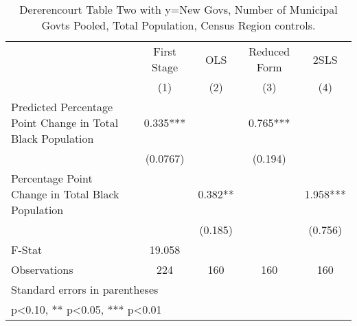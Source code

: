 \begin{table}[htbp]\centering
\def\sym#1{\ifmmode^{#1}\else\(^{#1}\)\fi}
\caption{Dererencourt Table Two with y=New Govs, Number of Municipal Govts  Pooled, Total Population, Census Region controls.}
\begin{tabular}{l*{4}{c}}
\toprule
                    & First Stage   &         OLS   &Reduced Form   &        2SLS   \\
                    &\multicolumn{1}{c}{(1)}   &\multicolumn{1}{c}{(2)}   &\multicolumn{1}{c}{(3)}   &\multicolumn{1}{c}{(4)}   \\
\midrule
Predicted Percentage Point Change in Total Black Population&       0.335***&               &       0.765***&               \\
                    &    (0.0767)   &               &     (0.194)   &               \\
\addlinespace
Percentage Point Change in Total Black Population&               &       0.382** &               &       1.958***\\
                    &               &     (0.185)   &               &     (0.756)   \\
\midrule
F-Stat              &      19.058   &               &               &               \\
Observations        &         224   &         160   &         160   &         160   \\
\bottomrule
\multicolumn{5}{l}{\footnotesize Standard errors in parentheses}\\
\multicolumn{5}{l}{\footnotesize * p<0.10, ** p<0.05, *** p<0.01}\\
\end{tabular}
\end{table}

